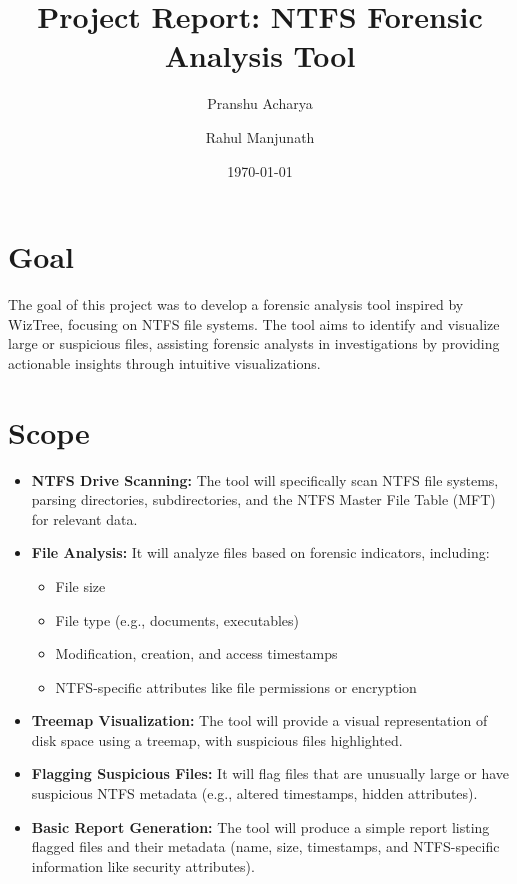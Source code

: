 \documentclass[a4paper,12pt]{article}
\title{Project Report: NTFS Forensic Analysis Tool}
\author{Pranshu Acharya \and Rahul Manjunath}
\date{\today}
\begin{document}
\maketitle

\section*{Goal}
The goal of this project was to develop a forensic analysis tool inspired by WizTree, focusing on NTFS file systems. The tool aims to identify and visualize large or suspicious files, assisting forensic analysts in investigations by providing actionable insights through intuitive visualizations.

\section*{Scope}
\begin{itemize}
    \item \textbf{NTFS Drive Scanning:} The tool will specifically scan NTFS file systems, parsing directories, subdirectories, and the NTFS Master File Table (MFT) for relevant data.
    
    \item \textbf{File Analysis:} It will analyze files based on forensic indicators, including:
    \begin{itemize}
        \item File size
        \item File type (e.g., documents, executables)
        \item Modification, creation, and access timestamps
        \item NTFS-specific attributes like file permissions or encryption
    \end{itemize}
    
    \item \textbf{Treemap Visualization:} The tool will provide a visual representation of disk space using a treemap, with suspicious files highlighted.
    
    \item \textbf{Flagging Suspicious Files:} It will flag files that are unusually large or have suspicious NTFS metadata (e.g., altered timestamps, hidden attributes).
    
    \item \textbf{Basic Report Generation:} The tool will produce a simple report listing flagged files and their metadata (name, size, timestamps, and NTFS-specific information like security attributes).
\end{itemize}
\end{document}
